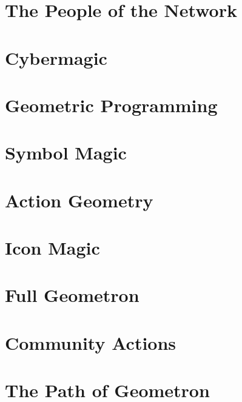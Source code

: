 \documentclass[ebook,12pt,openany]{memoir} %
\begin{document}
\chapter{The People of the Network}

\chapter{Cybermagic}

\chapter{Geometric Programming}

\chapter{Symbol Magic}

\chapter{Action Geometry}

\chapter{Icon Magic}

\chapter{Full Geometron}

\chapter{Community Actions}

\chapter{The Path of Geometron}



\end{document}
